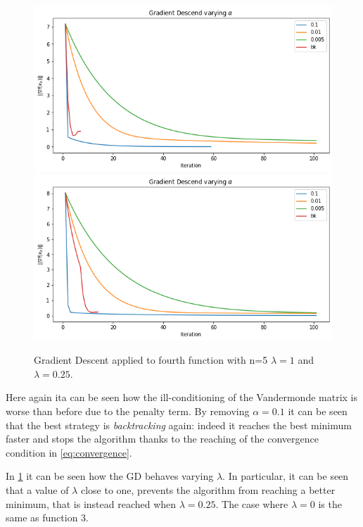 \documentclass[a4paper,10pt]{report}
\begin{document}
\begin{figure}[!htb]
    \includegraphics[width=\linewidth]{4_a_l1.png}
  \endminipage\hfill
    \includegraphics[width=\linewidth]{4_a_l025.png}
  \endminipage\hfill
  \caption{Gradient Descent applied to fourth function with n=5 $\lambda=1$ and $\lambda=0.25$.}
  \label{fig:4_l}
\end{figure}

Here again ita can be seen how the ill-conditioning of the Vandermonde matrix is worse than before due to the penalty term.
By removing $\alpha=0.1$ it can be seen that the best strategy is \emph{backtracking} again: indeed it reaches the best minimum faster and stops the algorithm thanks to the reaching of the convergence condition in \ref{eq:convergence}.

In \ref{fig:4_l} it can be seen how the GD behaves varying $\lambda$. In particular, it can be seen that a value of $\lambda$ close to one, prevents the algorithm from reaching a better minimum, that is instead reached when $\lambda=0.25$.
The case where $\lambda=0$ is the same as function 3.
\end{document}
